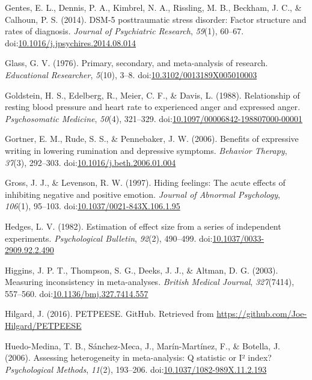 \documentclass[man, mask]{apa6}
\theoremstyle{definition}
\theoremstyle{definition}
\theoremstyle{definition}
\theoremstyle{remark}
\begin{document}
\hypertarget{ref-Gentes2014}{}
Gentes, E. L., Dennis, P. A., Kimbrel, N. A., Rissling, M. B., Beckham,
J. C., \& Calhoun, P. S. (2014). DSM-5 posttraumatic stress disorder:
Factor structure and rates of diagnosis. \emph{Journal of Psychiatric
Research}, \emph{59}(1), 60--67.
doi:\href{https://doi.org/10.1016/j.jpsychires.2014.08.014}{10.1016/j.jpsychires.2014.08.014}

\hypertarget{ref-Glass1976}{}
Glass, G. V. (1976). Primary, secondary, and meta-analysis of research.
\emph{Educational Researcher}, \emph{5}(10), 3--8.
doi:\href{https://doi.org/10.3102/0013189X005010003}{10.3102/0013189X005010003}

\hypertarget{ref-Goldstein1988}{}
Goldstein, H. S., Edelberg, R., Meier, C. F., \& Davis, L. (1988).
Relationship of resting blood pressure and heart rate to experienced
anger and expressed anger. \emph{Psychosomatic Medicine}, \emph{50}(4),
321--329.
doi:\href{https://doi.org/10.1097/00006842-198807000-00001}{10.1097/00006842-198807000-00001}

\hypertarget{ref-Gortner2006}{}
Gortner, E. M., Rude, S. S., \& Pennebaker, J. W. (2006). Benefits of
expressive writing in lowering rumination and depressive symptoms.
\emph{Behavior Therapy}, \emph{37}(3), 292--303.
doi:\href{https://doi.org/10.1016/j.beth.2006.01.004}{10.1016/j.beth.2006.01.004}

\hypertarget{ref-Gross1997}{}
Gross, J. J., \& Levenson, R. W. (1997). Hiding feelings: The acute
effects of inhibiting negative and positive emotion. \emph{Journal of
Abnormal Psychology}, \emph{106}(1), 95--103.
doi:\href{https://doi.org/10.1037/0021-843X.106.1.95}{10.1037/0021-843X.106.1.95}

\hypertarget{ref-Hedges1982}{}
Hedges, L. V. (1982). Estimation of effect size from a series of
independent experiments. \emph{Psychological Bulletin}, \emph{92}(2),
490--499.
doi:\href{https://doi.org/10.1037/0033-2909.92.2.490}{10.1037/0033-2909.92.2.490}

\hypertarget{ref-Higgins2003}{}
Higgins, J. P. T., Thompson, S. G., Deeks, J. J., \& Altman, D. G.
(2003). Measuring inconsistency in meta-analyses. \emph{British Medical
Journal}, \emph{327}(7414), 557--560.
doi:\href{https://doi.org/10.1136/bmj.327.7414.557}{10.1136/bmj.327.7414.557}

\hypertarget{ref-Hilgard2016}{}
Hilgard, J. (2016). PETPEESE. GitHub. Retrieved from
\url{https://github.com/Joe-Hilgard/PETPEESE}

\hypertarget{ref-Huedo-Medina2006}{}
Huedo-Medina, T. B., Sánchez-Meca, J., Marín-Martínez, F., \& Botella,
J. (2006). Assessing heterogeneity in meta-analysis: Q statistic or I²
index? \emph{Psychological Methods}, \emph{11}(2), 193--206.
doi:\href{https://doi.org/10.1037/1082-989X.11.2.193}{10.1037/1082-989X.11.2.193}
\end{document}

